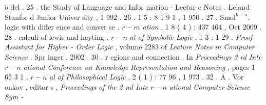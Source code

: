 \documentclass[10pt]{article}
\begin{document}
   $ \ddot{o} $  {\small del . }   
 {\small 25 . }     
 {\small the Study of Language and Infor mation - Lectur e Notes . Leland Stanfor d Junior } 
 {\small Univer sity , 1 992 . } 
 {\small 26 . }    
 {\small 1 5 : 8 1 9 1 , 1 950 . } 
 {\small 27 . }     \quad  $ \mathrm{Smol} ^{ \mathrm{k-a} } . $       
 {\small logic with differ ence and conver se . }   $ r-m $  {\small \textit{ation } , } 
 {\small 1 8 ( 4 ) : 437 464 , Oct 2009 . } 
 {\small 28 . }   
 {\small calculi of lewis and heyting . }   $ r-n $  {\small \textit{al of Symbolic Logic } , 1 3 : 1 }  
 {\small 29 . }   
 {\small \textit{Proof Assistant for Higher - Order Logic } , volume 2283 of \textit{Lecture Notes in Computer } } 
 {\small \textit{Science } . Spr inger , 2002 . } 
 {\small 30 . }   
 {\small r egions and connection . In \textit{Proceedings 3 rd Inte } }  $ r-n $  {\small \textit{ational Conference on Knowledge } } 
 {\small \textit{Representation and Reasoning } , pages 1 65 }  
 {\small 3 1 . }     $ r-n $  {\small \textit{al of Philosophical Logic } , } 
 {\small 2 ( 1 ) : 77 96 , 1 973 . } 
 {\small 32 . }           
 {\small A . Vor onkov , editor s , \textit{Proceedings of the 2 nd Inte } }  $ r-n $  {\small \textit{ational Computer Science Sym - } } 
\end{document}
